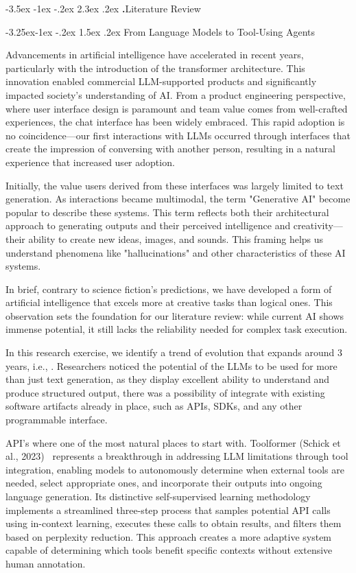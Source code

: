 \documentclass[journal,twoside,10pt]{IEEEtran}
\makeatletter
\renewcommand\section{\@startsection{section}{1}{\z@}%
                       {-3.5ex \@plus -1ex \@minus -.2ex}%
                       {2.3ex \@plus.2ex}%
                       {\normalfont\Large\bfseries\Roman{section}.\quad}}
\renewcommand\subsection{\@startsection{subsection}{2}{\z@}%
                       {-3.25ex\@plus -1ex \@minus -.2ex}%
                       {1.5ex \@plus .2ex}%
                       {\normalfont\large\bfseries}}
\makeatother
\begin{document}
\section{Literature Review}

\subsection{From Language Models to Tool-Using Agents}

Advancements in artificial intelligence have accelerated in recent years, particularly with the introduction of the transformer architecture. This innovation enabled commercial LLM-supported products and significantly impacted society's understanding of AI. From a product engineering perspective, where user interface design is paramount and team value comes from well-crafted experiences, the chat interface has been widely embraced. This rapid adoption is no coincidence—our first interactions with LLMs occurred through interfaces that create the impression of conversing with another person, resulting in a natural experience that increased user adoption.

Initially, the value users derived from these interfaces was largely limited to text generation. As interactions became multimodal, the term "Generative AI" become popular to describe these systems. This term reflects both their architectural approach to generating outputs and their perceived intelligence and creativity—their ability to create new ideas, images, and sounds. This framing helps us understand phenomena like "hallucinations" and other characteristics of these AI systems.

In brief, contrary to science fiction's predictions, we have developed a form of artificial intelligence that excels more at creative tasks than logical ones. This observation sets the foundation for our literature review: while current AI shows immense potential, it still lacks the reliability needed for complex task execution.

In this research exercise, we identify a trend of evolution that expands around 3 years, i.e., \cite{schick2023toolformer, qin2023toolllm}. Researchers noticed the potential of the LLMs to be used for more than just text generation, as they display excellent ability to understand and produce structured output, there was a possibility of integrate with existing software artifacts already in place, such as APIs, SDKs, and any other programmable interface.

API's where one of the most natural places to start with.  Toolformer (Schick et al., 2023)~\cite{schick2023toolformer} represents a breakthrough in addressing LLM limitations through tool integration, enabling models to autonomously determine when external tools are needed, select appropriate ones, and incorporate their outputs into ongoing language generation. Its distinctive self-supervised learning methodology implements a streamlined three-step process that samples potential API calls using in-context learning, executes these calls to obtain results, and filters them based on perplexity reduction. This approach creates a more adaptive system capable of determining which tools benefit specific contexts without extensive human annotation.
\end{document}
